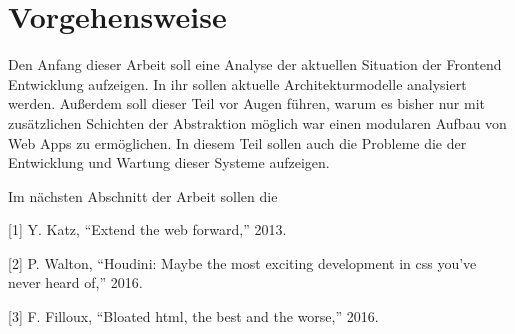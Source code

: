 \section{Vorgehensweise}\label{vorgehensweise}

Den Anfang dieser Arbeit soll eine Analyse der aktuellen Situation der
Frontend Entwicklung aufzeigen. In ihr sollen aktuelle
Architekturmodelle analysiert werden. Außerdem soll dieser Teil vor
Augen führen, warum es bisher nur mit zusätzlichen Schichten der
Abstraktion möglich war einen modularen Aufbau von Web Apps zu
ermöglichen. In diesem Teil sollen auch die Probleme die der Entwicklung
und Wartung dieser Systeme aufzeigen.

Im nächsten Abschnitt der Arbeit sollen die

\hypertarget{refs}{}
\hypertarget{ref-Katz2013}{}
{[}1{]} Y. Katz, ``Extend the web forward,'' 2013.

\hypertarget{ref-Walton2016}{}
{[}2{]} P. Walton, ``Houdini: Maybe the most exciting development in css
you've never heard of,'' 2016.

\hypertarget{ref-Filloux2016}{}
{[}3{]} F. Filloux, ``Bloated html, the best and the worse,'' 2016.
